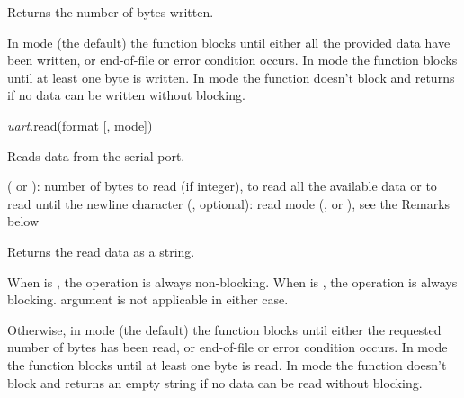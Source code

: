 \documentclass[a4paper,12pt,twoside,extrafontsizes]{memoir}
\begin{document}
\begin{funcret}
	Returns the number of bytes written.
\end{funcret}

\begin{funcremarks}
	In  mode (the default) the function blocks until either all the provided data have been written, or end-of-file or error condition occurs. In  mode the function blocks until at least one byte is written. In  mode the function doesn't block and returns  if no data can be written without blocking.
\end{funcremarks}


\begin{luafuncprototype}
\emph{uart}.read(format [, mode])
\end{luafuncprototype}

\begin{funcdescr}
	Reads data from the serial port.
\end{funcdescr}

\begin{funcparams}
	 ( or ): number of bytes to read (if integer),  to read all the available data or  to read until the newline character
	 (, optional): read mode (,  or ), see the Remarks below
\end{funcparams}

\begin{funcret}
	Returns the read data as a string.
\end{funcret}

\begin{funcremarks}
	When  is , the operation is always non-blocking. When  is , the operation is always blocking.  argument is not applicable in either case.
	
	Otherwise, in  mode (the default) the function blocks until either the requested number of bytes has been read, or end-of-file or error condition occurs. In  mode the function blocks until at least one byte is read. In  mode the function doesn't block and returns an empty string if no data can be read without blocking.
\end{funcremarks}
\end{document}
